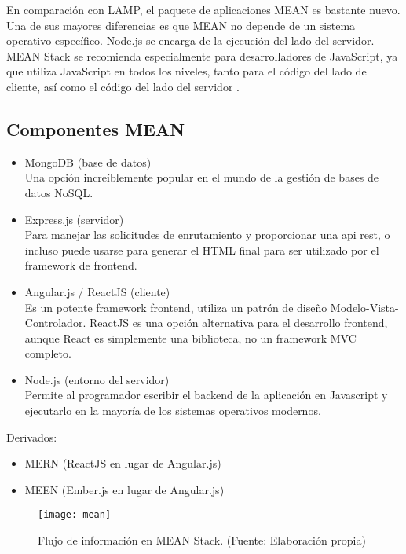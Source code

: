 En comparación con LAMP, el paquete de aplicaciones MEAN es bastante nuevo. Una de sus mayores diferencias es que MEAN no depende de un sistema operativo específico. Node.js se encarga de la ejecución del lado del servidor. MEAN Stack se recomienda especialmente para desarrolladores de JavaScript, ya que utiliza JavaScript en todos los niveles, tanto para el código del lado del cliente, así como el código del lado del servidor \cite{srinivasan}.
\vspace{0.8cm}

\subsection{Componentes MEAN}
\begin{itemize}
  \item MongoDB (base de datos)\\
  Una opción increíblemente popular en el mundo de la gestión de bases de datos NoSQL.
  \item Express.js (servidor)\\
  Para manejar las solicitudes de enrutamiento y proporcionar una \acrshort{api} \acrshort{rest}, o incluso puede usarse para generar el HTML final para ser utilizado por el \gls{framework} de \gls{frontend}.
  \item Angular.js / ReactJS (cliente)\\
  Es un potente \gls{framework} \gls{frontend}, utiliza un patrón de diseño Modelo-Vista-Controlador. ReactJS es una opción alternativa para el desarrollo \gls{frontend}, aunque React es simplemente una biblioteca, no un \gls{framework} MVC completo.
  \item Node.js (entorno del servidor)\\
  Permite al programador escribir el \gls{backend} de la aplicación en Javascript y ejecutarlo en la mayoría de los sistemas operativos modernos.
\end{itemize}

Derivados:

\begin{itemize}
  \item MERN (ReactJS en lugar de Angular.js)
  \item MEEN (Ember.js en lugar de Angular.js)
\end{itemize} 

\begin{figure}[H]
  \centering
  \texttt{[image: mean]}
  \caption{Flujo de información en MEAN Stack. (Fuente: Elaboración propia)}
\end{figure}

